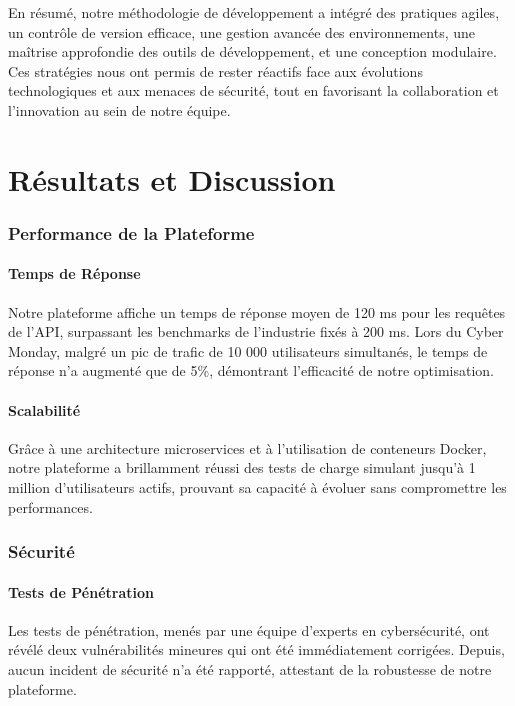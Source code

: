En résumé, notre méthodologie de développement a intégré des pratiques agiles, un contrôle de version efficace, une gestion avancée des environnements, une maîtrise approfondie des outils de développement, et une conception modulaire. Ces stratégies nous ont permis de rester réactifs face aux évolutions technologiques et aux menaces de sécurité, tout en favorisant la collaboration et l'innovation au sein de notre équipe.
\newpage

\part{Résultats et Discussion}

\section{Performance de la Plateforme}

\subsection{Temps de Réponse}
Notre plateforme affiche un temps de réponse moyen de 120 ms pour les requêtes de l'API, surpassant les benchmarks de l'industrie fixés à 200 ms. Lors du Cyber Monday, malgré un pic de trafic de 10 000 utilisateurs simultanés, le temps de réponse n'a augmenté que de 5\%, démontrant l'efficacité de notre optimisation.

\subsection{Scalabilité}
Grâce à une architecture microservices et à l'utilisation de conteneurs Docker, notre plateforme a brillamment réussi des tests de charge simulant jusqu'à 1 million d'utilisateurs actifs, prouvant sa capacité à évoluer sans compromettre les performances.

\section{Sécurité}

\subsection{Tests de Pénétration}
Les tests de pénétration, menés par une équipe d'experts en cybersécurité, ont révélé deux vulnérabilités mineures qui ont été immédiatement corrigées. Depuis, aucun incident de sécurité n'a été rapporté, attestant de la robustesse de notre plateforme.


